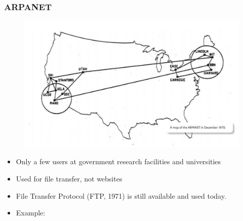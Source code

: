 \documentclass{beamer}
\begin{document}
%
%
\begin{frame}[fragile]
    \frametitle{ARPANET}
    \begin{minipage}{0.48\textwidth}
        \begin{figure}
            \includegraphics[width=\textwidth]{./imgs/arpanet.png}
        \end{figure}
    \end{minipage}
    \begin{minipage}{0.48\textwidth}
        \begin{itemize}
            \item Only a few users at government research facilities and universities
            \item Used for file transfer, not websites
            \item File Transfer Protocol (FTP, 1971) is still available and used today.
            \item Example: 
        \end{itemize}
    \end{minipage}
\end{frame}
\end{document}
